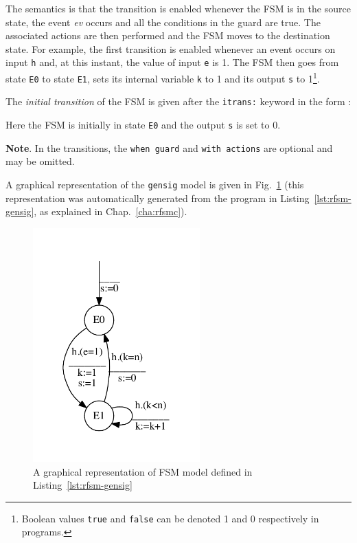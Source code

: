 The semantics is that the transition is enabled
whenever the FSM is in the source state, the event \emph{ev} occurs and all the conditions in the
guard are true. The associated actions
are then performed and the FSM moves to the destination state. For example, the first transition is
enabled whenever an event occurs on input \verb|h| and, at this instant, the value of input \verb|e|
is 1. The FSM then goes from state \verb|E0| to state \verb|E1|, sets its internal variable 
\verb|k| to 1 and its output \verb|s| to 1\footnote{Boolean values \texttt{true} and \texttt{false} can
  be denoted 1 and 0 respectively in programs.}.
   
\medskip
The \emph{initial transition} of the FSM is given 
after the \verb|itrans:| keyword in the form :
\begin{center}
\end{center}
Here the FSM is initially in state \verb|E0| and the output \verb|s| is set to 0.

\medskip
\textbf{Note}. In the transitions, the \lstinline[language=Rfsm]{when guard} and
\lstinline[language=Rfsm]{with actions} are optional and may be omitted.

\medskip
A graphical representation of the \verb|gensig| model is given in
Fig.~\ref{fig:rfsm-gensig-model} (this representation was automatically generated from the
program in Listing~\ref{lst:rfsm-gensig}, as explained in Chap.~\ref{cha:rfsmc}). 

\begin{figure}[!h]
   \includegraphics[height=9cm]{figs/gensig-model}
   \centering
  \caption{A graphical representation of FSM model defined in Listing~\ref{lst:rfsm-gensig}}
  \label{fig:rfsm-gensig-model}
\end{figure}


